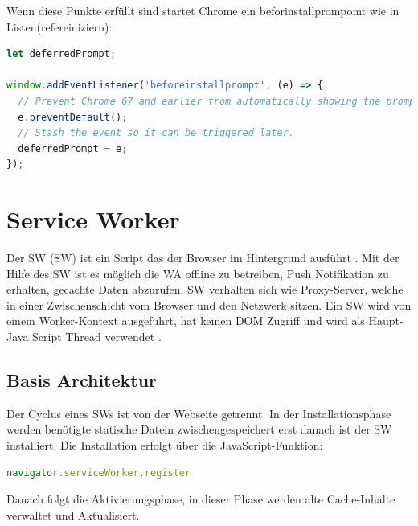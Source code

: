Wenn diese Punkte erfüllt sind startet Chrome ein beforinstallprompomt wie in Listen(refereiniziern):

\begin{lstlisting}[language=JavaScript, caption={beforinstallprompt},label=lst:beforinstallprompt, xleftmargin=50pt]
let deferredPrompt;

window.addEventListener('beforeinstallprompt', (e) => {
  // Prevent Chrome 67 and earlier from automatically showing the prompt
  e.preventDefault();
  // Stash the event so it can be triggered later.
  deferredPrompt = e;
});
\end{lstlisting}



\section{Service Worker}
Der \acl{SW} (\acs{SW}) ist ein Script das der Browser im Hintergrund ausführt \cite{ServiceWorkerRegistration}. Mit der Hilfe des \acs{SW} ist es möglich die \acs{WA} offline zu betreiben, Push Notifikation zu erhalten, gecachte Daten abzurufen. \acs{SW} verhalten sich wie Proxy-Server, welche in einer Zwischenschicht vom Browser und den Netzwerk sitzen. 
Ein \acs{SW} wird von einem Worker-Kontext \cite{Worker} ausgeführt, hat keinen DOM Zugriff und wird als Haupt-Java Script Thread verwendet \cite{ServiceWorker}.

\subsection{Basis Architektur}
Der Cyclus eines \acs{SW}s ist von der Webseite getrennt.
In der Installationsphase werden benötigte statische Datein zwischengespeichert erst danach ist der \acs{SW} installiert. Die Installation erfolgt über die JavaScript-Funktion:

\begin{lstlisting}[language=JavaScript, caption={Service Worker Navigator},label=lst:ServiceWorkerNavigator, xleftmargin=50pt]
navigator.serviceWorker.register
\end{lstlisting}

Danach folgt die Aktivierungsphase, in dieser Phase werden alte Cache-Inhalte verwaltet und Aktualisiert.


